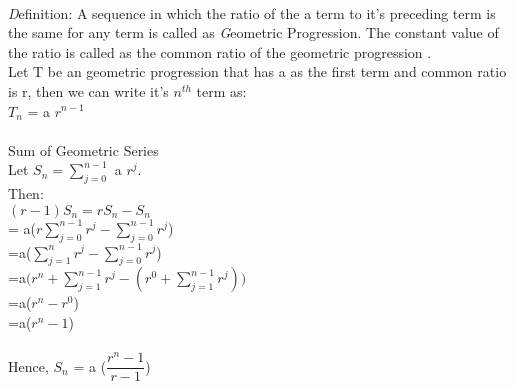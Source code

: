 \documentclass{article}
\begin{document}
 \\
 {\emph Definition:} \hspace{2mm} A sequence in which the ratio of the a term to it's preceding term is the same for any term is called as {\emph Geometric Progression}. 
 The constant value of the ratio is called as the common ratio of the geometric progression .
 \\Let T be an geometric progression that has a as the first term and common ratio is r, then we can write it's $n^{th}$ term as:
 \\$T_{n}$ = a $r^{n-1}$
 \\
 \\
 {\large Sum of Geometric Series } ~\cite{wiki}
 \vspace{2mm}
\\Let $S_n =\displaystyle\sum_{j \mathop = 0}^{n - 1}$ a $r^j$.
\\Then:
\\$(r - 1) S_n =r S_n - S_n$\vspace{1mm}
\\ \hspace*{14mm} = a($r \displaystyle\sum_{j \mathop = 0}^{n - 1} r^j - \displaystyle\sum_{j \mathop = 0}^{n - 1} r^j$)\vspace{1mm}
\\ \hspace*{14mm}  =a($ \displaystyle\sum_{j \mathop = 1}^n r^j - \displaystyle\sum_{j \mathop = 0}^{n - 1} r^j $\vspace{1mm})
\\ \hspace*{14mm}  =a$ \Bigg(r^n + \displaystyle\sum_{j \mathop = 1}^{n-1} r^j - \left({r^0 + \displaystyle\sum_{j \mathop = 1}^{n - 1} r^j}\right) \Bigg) $ \vspace{1mm}
\\ \hspace*{14mm}  =a($r^n - r^0$) \vspace{1mm}
\\ \hspace*{14mm}  =a($r^n - 1 $)\vspace{1mm}
\\
\\ Hence, $S_n$ = a ($\dfrac{r^n -1}{r-1}$)
\vspace{5mm}
{}

\end{document}
